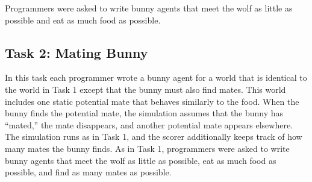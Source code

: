 Programmers were asked to write bunny agents that meet the wolf as little as possible and eat as much food as possible.

\subsection{Task 2: Mating Bunny}\label{sec:task2}

In this task each programmer wrote a bunny agent for a world that is identical to the world in Task 1 except that the bunny must also find mates.  This world includes one static  potential mate that behaves similarly to the food.  When the bunny finds the potential mate, the simulation assumes that the bunny has ``mated,'' the mate disappears, and another potential mate appears elsewhere.  The simulation runs as in Task 1, and the scorer additionally keeps track of how many mates the bunny finds.  As in Task 1, programmers were asked to write bunny agents that meet the wolf as little as possible, eat as much food as possible, and find as many mates as possible.







